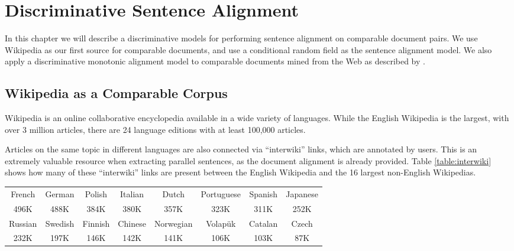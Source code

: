 \chapter{Discriminative Sentence Alignment}
\label{chap:supervised}

In this chapter we will describe a discriminative models for performing sentence
alignment on comparable document pairs. We use Wikipedia as our first source for
comparable documents, and use a conditional random field \citep{Lafferty01} as
the sentence alignment model. We also apply a discriminative monotonic alignment model to
comparable documents mined from the Web as described by \citet{Uszkoreit10}.

\section{Wikipedia as a Comparable Corpus}
\label{sec:wiki}
Wikipedia \citep{wikipedia} is an online collaborative encyclopedia available in
a wide variety of languages.  While the English Wikipedia is the largest, with
over 3 million articles, there are 24 language editions with at least 100,000
articles.

Articles on the same topic in different languages are also connected via
``interwiki'' links, which are annotated by users.  This is an extremely
valuable resource when extracting parallel sentences, as the document alignment
is already provided.  
Table \ref{table:interwiki} shows how
many of these ``interwiki'' links are present between the English Wikipedia and the
16 largest non-English Wikipedias.

\begin{table*}
\small
\begin{center}
\begin{tabular}{|c|c|c|c|c|c|c|c|}
\hline
French & German & Polish & Italian & Dutch & Portuguese & Spanish & Japanese \\
496K & 488K & 384K & 380K & 357K & 323K & 311K & 252K\\
\hline
Russian & Swedish & Finnish & Chinese & Norwegian & Volap\"{u}k & Catalan & Czech \\
232K & 197K & 146K & 142K & 141K & 106K & 103K & 87K\\
\hline
\end{tabular}
\end{center}
\caption{Number of aligned bilingual articles in Wikipedia by language (paired with English).}
\label{table:interwiki}
\end{table*}

